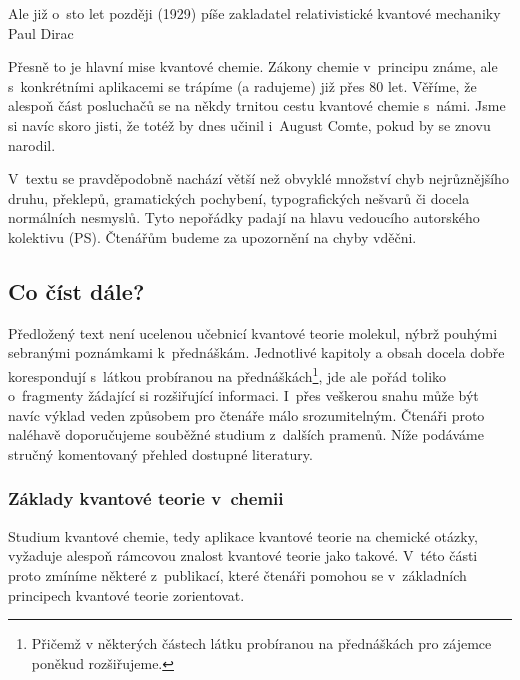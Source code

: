 \bigskip

Ale již o~sto let později (1929) píše zakladatel relativistické kvantové mechaniky Paul Dirac

\bigskip


\bigskip

Přesně to je hlavní mise kvantové chemie. Zákony chemie v~principu známe, ale s~konkrétními aplikacemi se trápíme (a radujeme) již přes 80 let. Věříme, že alespoň část posluchačů se na někdy trnitou cestu kvantové chemie s~námi. Jsme si navíc skoro jisti, že totéž by dnes učinil i~August Comte, pokud by se znovu narodil.
 

V~textu se pravděpodobně nachází větší než obvyklé množství chyb nejrůznějšího druhu, překlepů, gramatických pochybení, typografických nešvarů či docela normálních nesmyslů. Tyto nepořádky padají na hlavu vedoucího autorského kolektivu (PS). Čtenářům budeme za upozornění na chyby vděčni.  



\subsection{Co číst dále?}
Předložený text není ucelenou učebnicí kvantové teorie molekul, nýbrž pouhými sebranými poznámkami k~přednáškám. Jednotlivé kapitoly a obsah docela dobře korespondují s~látkou probíranou na přednáškách\footnote{Přičemž v některých částech látku probíranou na přednáškách pro zájemce poněkud rozšiřujeme.}, jde ale pořád toliko o~fragmenty žádající si rozšiřující informaci. I~přes veškerou snahu může být navíc výklad veden způsobem pro čtenáře málo srozumitelným. Čtenáři proto naléhavě doporučujeme souběžné studium z~dalších pramenů. Níže podáváme stručný komentovaný přehled dostupné literatury.

   	
\subsubsection{Základy kvantové teorie v~chemii}

Studium kvantové chemie, tedy aplikace kvantové teorie na chemické otázky, vyžaduje alespoň rámcovou znalost kvantové teorie jako takové. V~této části proto zmíníme některé z~publikací, které čtenáři pomohou se v~základních principech kvantové teorie zorientovat.

